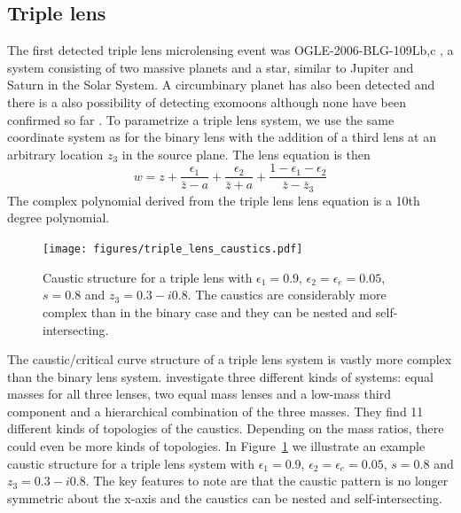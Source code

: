 \documentclass[12pt,dvipsnames]{report}
\begin{document}
\subsection{Triple lens}
The first detected triple lens microlensing event was OGLE-2006-BLG-109Lb,c
\citep{2008Sci...319..927G,2010ApJ...713..837B}, a system consisting of two
massive planets and a star, similar to Jupiter and Saturn in the Solar System.
A circumbinary planet has also been detected \citep{2016AJ....152..125B} and
there is a also possibility of detecting exomoons although none have been
confirmed so far \citep{2010A&A...520A..68L}. To parametrize a triple lens
system, we use the same coordinate system as for the binary lens with the
addition of a third lens at an arbitrary location $z_3$ in the source plane.
The lens equation is then
\begin{equation}
    w=z+\frac{\epsilon_{1}}{\bar{z} - a}+\frac{\epsilon_{2}}{\bar{z} + a} +
    \frac{1 - \epsilon_1 - \epsilon_2}{\bar{z} - \bar{z}_3}
\end{equation}
The complex polynomial derived from the triple lens lens equation is a 10th degree
polynomial.

\begin{figure}[t]
    \centering
    \texttt{[image: figures/triple\_lens\_caustics.pdf]}
    \caption{Caustic structure for a triple lens with
        $\epsilon_1=0.9$, $\epsilon_2=\epsilon_e=0.05$, $s=0.8$ and $z_3=0.3-i0.8$.
        The caustics are considerably more complex than in the binary case and they
        can be nested and self-intersecting.
    }
    \label{fig:triple_lens_caustics}
\end{figure}

The caustic/critical curve structure of a triple lens system is vastly more
complex than the binary lens system. \citet{2019ApJ...880...72D} investigate
three different kinds of systems: equal masses for all three lenses, two equal
mass lenses and a low-mass third component and a hierarchical combination of
the three masses. They find 11 different kinds of topologies of the caustics.
Depending on the mass ratios, there could even be more kinds of topologies. In
Figure~\ref{fig:triple_lens_caustics} we illustrate an example caustic
structure for a triple lens system with $\epsilon_1=0.9$,
$\epsilon_2=\epsilon_e=0.05$, $s=0.8$ and $z_3=0.3-i0.8$. The key features to
note are that the caustic pattern is no longer symmetric about the x-axis and
the caustics can be nested and self-intersecting.
\end{document}
